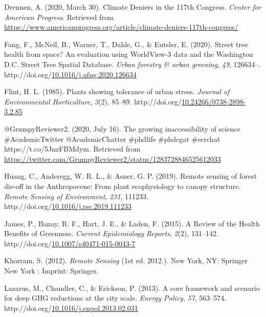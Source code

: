 \documentclass[12pt,twoside]{reedthesis}
\newlength{\cslhangindent}
\newenvironment{CSLReferences}[2] %
 {%
  \setlength{\parindent}{0pt}
  \ifodd #1 \everypar{\setlength{\hangindent}{\cslhangindent}}\ignorespaces\fi
  \ifnum #2 > 0
  \setlength{\parskip}{#2\baselineskip}
  \fi
 }%
 {}
\begin{document}
\begin{CSLReferences}{1}{0}
\leavevmode{}%
Drennen, A. (2020, March 30). Climate Deniers in the 117th Congress. \emph{Center for American Progress}. Retrieved from \url{https://www.americanprogress.org/article/climate-deniers-117th-congress/}

\leavevmode{}%
Fang, F., McNeil, B., Warner, T., Dahle, G., \& Eutsler, E. (2020). Street tree health from space? An evaluation using WorldView-3 data and the Washington D.C. Street Tree Spatial Database. \emph{Urban forestry \& urban greening}, \emph{49}, 126634--. http://doi.org/\href{https://doi.org/10.1016/j.ufug.2020.126634}{10.1016/j.ufug.2020.126634}

\leavevmode{}%
Flint, H. L. (1985). Plants showing tolerance of urban stress. \emph{Journal of Environmental Horticulture}, \emph{3}(2), 85--89. http://doi.org/\href{https://doi.org/10.24266/0738-2898-3.2.85}{10.24266/0738-2898-3.2.85}

\leavevmode{}%
@GrumpyReviewer2. (2020, July 16). The growing inaccessibility of science {\#}AcademicTwitter @AcademicChatter {\#}phdlife {\#}phdcgat {\#}ecrchat https://t.co/5JnzFBMdym. Retrieved from \url{https://twitter.com/GrumpyReviewer2/status/1283728846525612033}

\leavevmode{}%
Huang, C., Anderegg, W. R. L., \& Asner, G. P. (2019). Remote sensing of forest die-off in the Anthropocene: From plant ecophysiology to canopy structure. \emph{Remote Sensing of Environment}, \emph{231}, 111233. http://doi.org/\href{https://doi.org/10.1016/j.rse.2019.111233}{10.1016/j.rse.2019.111233}

\leavevmode{}%
James, P., Banay, R. F., Hart, J. E., \& Laden, F. (2015). A Review of the Health Benefits of Greenness. \emph{Current Epidemiology Reports}, \emph{2}(2), 131--142. http://doi.org/\href{https://doi.org/10.1007/s40471-015-0043-7}{10.1007/s40471-015-0043-7}

\leavevmode{}%
Khorram, S. (2012). \emph{Remote Sensing} (1st ed. 2012.). New York, NY: Springer New York : Imprint: Springer.

\leavevmode{}%
Lazarus, M., Chandler, C., \& Erickson, P. (2013). A core framework and scenario for deep GHG reductions at the city scale. \emph{Energy Policy}, \emph{57}, 563--574. http://doi.org/\href{https://doi.org/10.1016/j.enpol.2013.02.031}{10.1016/j.enpol.2013.02.031}


\end{CSLReferences}
\end{document}
